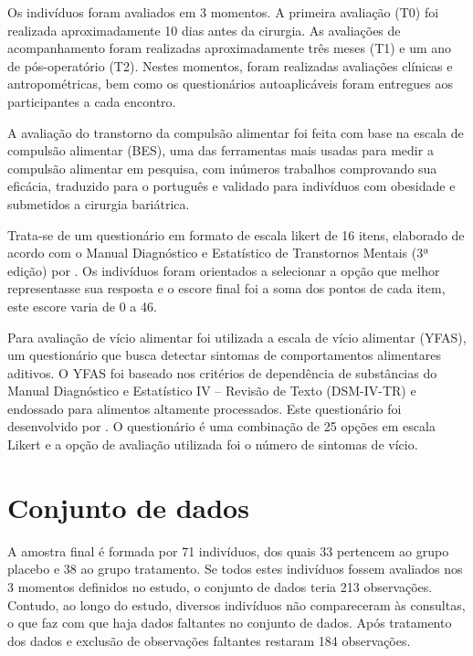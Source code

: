 Os indivíduos foram avaliados em 3 momentos. A primeira avaliação (T0) foi realizada aproximadamente 10 dias antes da cirurgia. As avaliações de acompanhamento foram realizadas aproximadamente três meses (T1) e um ano de pós-operatório (T2). Nestes momentos, foram realizadas avaliações clínicas e antropométricas, bem como os questionários autoaplicáveis foram entregues aos participantes a cada encontro.

A avaliação do transtorno da compulsão alimentar foi feita com base na escala de compulsão alimentar (BES), uma das ferramentas mais usadas para medir a compulsão alimentar em pesquisa, com inúmeros trabalhos comprovando sua eficácia, traduzido para o português e validado para indivíduos com obesidade e submetidos a cirurgia bariátrica. 

Trata-se de um questionário em formato de escala likert de 16 itens, elaborado de acordo com o Manual Diagnóstico e Estatístico de Transtornos Mentais (3ª edição) \citep{spitzer1980diagnostic} por \citet{gormally1982assessment}. Os indivíduos foram orientados a selecionar a opção que melhor representasse sua resposta e o escore final foi a soma dos pontos de cada item, este escore varia de 0 a 46.

Para avaliação de vício alimentar foi utilizada a escala de vício alimentar (YFAS), um questionário que busca detectar sintomas de comportamentos alimentares aditivos. O YFAS foi baseado nos critérios de dependência de substâncias do Manual Diagnóstico e Estatístico IV – Revisão de Texto (DSM-IV-TR) \citep{segal2010diagnostic} e endossado para alimentos altamente processados. Este questionário foi desenvolvido por \citet{gearhardt2009preliminary}. O questionário é uma combinação de 25 opções em escala Likert e a opção de avaliação utilizada foi o número de sintomas de vício.


\section{Conjunto de dados}\label{sec:dataset}

A amostra final é formada por 71 indivíduos, dos quais 33 pertencem ao grupo placebo e 38 ao grupo tratamento. Se todos estes indivíduos fossem avaliados nos 3 momentos definidos no estudo, o conjunto de dados teria 213 observações. Contudo, ao longo do estudo, diversos indivíduos não compareceram às consultas, o que faz com que haja dados faltantes no conjunto de dados. Após tratamento dos dados e exclusão de observações faltantes restaram 184 observações.

